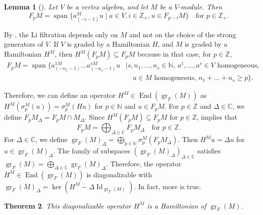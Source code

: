 \documentclass[a4paper, 12pt, reqno]{amsart}
\newtheorem{theorem}{Theorem}[section]
\newtheorem{lemma}[theorem]{Lemma}
\theoremstyle{remark}
\DeclareMathOperator{\Id}{Id}
\DeclareMathOperator{\gr}{gr}
\DeclareMathOperator{\End}{End}
\DeclareMathOperator{\vspan}{span}
\begin{document}
\begin{lemma}[{\cite[Lemma 2.9]{li_abelianizing_2005}}]
  \label{lmm:24}
  Let $V$ be a vertex algebra, and let $M$ be a $V$-module.
  Then
  \begin{equation*}
    F_pM = \vspan\{a^M_{(-i - 1)}u \mid a \in V, i \in \mathbb{Z}_+, u \in F_{p - i}M\} \quad \text{for $p \in \mathbb{Z}_+$}.
  \end{equation*}
\end{lemma}

By , the Li filtration depends only on $M$ and not on the choice of the strong generators of $V$.
If $V$ is graded by a Hamiltonian $H$, and $M$ is graded by a Hamiltonian $H^M$, then $H^M(F_pM) \subseteq F_pM$ because in that case, for $p \in \mathbb{Z}$,
\begin{equation*}
  \begin{split}
    F_pM = \vspan\{a^{1M}_{(-n_1 - 1)}\dots a^{sM}_{(-n_s - 1)}u &\mid \text{$s, n_1, \dots, n_s \in \mathbb{N}$, $a^1, \dots, a^s \in V$ homogeneous,} \\
                                                                 &\quad \text{$u \in M$ homogeneous, $n_1 + \dots + n_s \ge p$}\}.
  \end{split}
\end{equation*}

Therefore, we can define an operator $H^M \in \End(\gr_F(M))$ as $H^M(\sigma^M_p(u)) = \sigma^M_p(Hu)$ for $p \in \mathbb{N}$ and $u \in F_pM$.
For $p \in \mathbb{Z}$ and $\Delta \in \mathbb{C}$, we define $F_pM_{\Delta} = F_pM \cap M_{\Delta}$.
Since $H^M(F_pM) \subseteq F_pM$ for $p \in \mathbb{Z}$,  implies that
\begin{equation*}
  F_pM = \bigoplus_{\Delta \in \mathbb{C}}F_pM_{\Delta} \quad \text{for $p \in \mathbb{Z}$}.
\end{equation*}
For $\Delta \in \mathbb{C}$, we define $\gr_F(M)_{\Delta} = \bigoplus_{p \in \mathbb{N}}\sigma^M_p(F_pM_{\Delta})$.
Then $H^Mu = \Delta u$ for $u \in \gr_F(M)_{\Delta}$.
The family of subspaces $(\gr_F(M)_{\Delta})_{\Delta \in \mathbb{C}}$ satisfies $\gr_F(M) = \bigoplus_{\Delta \in \mathbb{C}}\gr_F(M)_{\Delta}$.
Therefore, the operator $H^M \in \End(\gr_F(M))$ is diagonalizable with $\gr_F(M)_{\Delta} = \ker(H^M - \Delta\Id_{\gr_F(M)})$.
In fact, more is true.

\begin{theorem}
  \label{thr:50}
  This diagonalizable operator $H^M$ is a Hamiltonian of $\gr_F(M)$.
\end{theorem}
\end{document}
